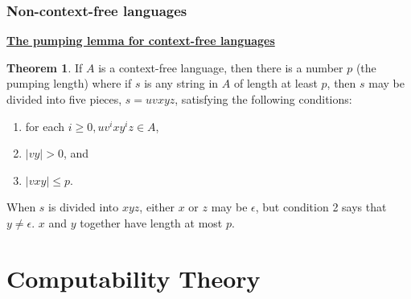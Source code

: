 \documentclass[11pt]{article}
\theoremstyle{definition}
\newtheorem{thm}{Theorem}[section]
\begin{document}
\subsubsection{Non-context-free languages}
\textbf{\underline{The pumping lemma for context-free languages}}
\begin{thm}
    If $A$ is a context-free language, then there is a number $p$ (the pumping length) where if $s$ is any string in $A$ of length at least $p$, then $s$ may be divided into five pieces, $s = uvxyz$, satisfying the following conditions:
    \begin{enumerate}
        \item for each $i\geq 0, uv^ixy^iz\in A$,
        \item $|vy|>0$, and
        \item $|vxy| \leq p$.
    \end{enumerate}
When $s$ is divided into $xyz$, either $x$ or $z$ may be $\epsilon$, but condition 2 says that $y \neq \epsilon$. $x$ and $y$ together have length at most $p$.
\end{thm}
\pagebreak
\section{Computability Theory}
\end{document}

